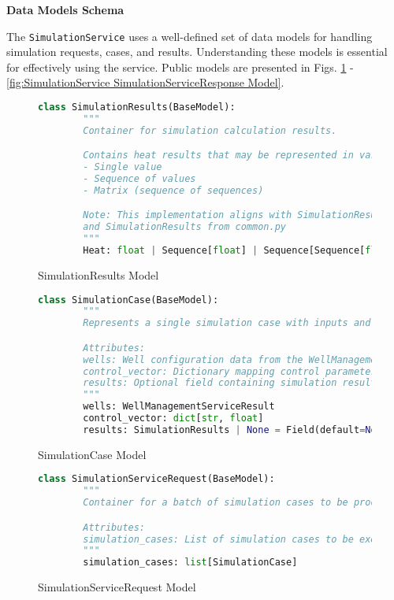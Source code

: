 \textbf{Data Models Schema}

The \texttt{SimulationService} uses a well-defined set of data models for handling simulation requests, cases, and results. Understanding these models is essential for effectively using the service. Public models are presented in Figs. \ref{fig:SimulationService SimulationResults Model} - \ref{fig:SimulationService SimulationServiceResponse Model}.

\begin{figure}[H]
	\begin{lstlisting}[language=Python]
		class SimulationResults(BaseModel):
		"""
		Container for simulation calculation results.

		Contains heat results that may be represented in various formats:
		- Single value
		- Sequence of values
		- Matrix (sequence of sequences)

		Note: This implementation aligns with SimulationResultType
		and SimulationResults from common.py
		"""
		Heat: float | Sequence[float] | Sequence[Sequence[float] | float]
	\end{lstlisting}
	\caption{SimulationResults Model}
	\label{fig:SimulationService SimulationResults Model}
\end{figure}

\begin{figure}[H]
	\begin{lstlisting}[language=Python]
		class SimulationCase(BaseModel):
		"""
		Represents a single simulation case with inputs and optional results.

		Attributes:
		wells: Well configuration data from the WellManagement service
		control_vector: Dictionary mapping control parameters to their values
		results: Optional field containing simulation results when completed
		"""
		wells: WellManagementServiceResult
		control_vector: dict[str, float]
		results: SimulationResults | None = Field(default=None)
	\end{lstlisting}
	\caption{SimulationCase Model}
	\label{fig:SimulationService SimulationCase Model}
\end{figure}

\begin{figure}[H]
	\begin{lstlisting}[language=Python]
		class SimulationServiceRequest(BaseModel):
		"""
		Container for a batch of simulation cases to be processed.

		Attributes:
		simulation_cases: List of simulation cases to be executed
		"""
		simulation_cases: list[SimulationCase]
	\end{lstlisting}
	\caption{SimulationServiceRequest Model}
	\label{fig:SimulationService SimulationServiceRequest Model}
\end{figure}

